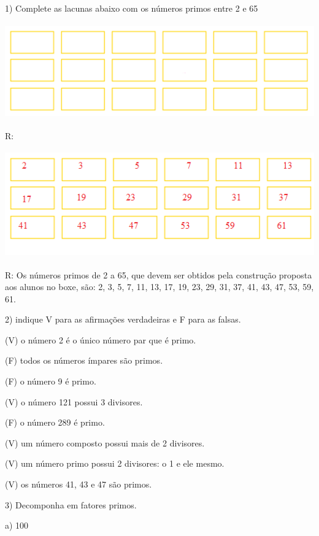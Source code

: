 
1) Complete as lacunas abaixo com os números primos entre 2 e 65


\includegraphics[width=5.54167in,height=1.625in]{./imgSAEB_6_MAT/media/image9.png}

R:

\includegraphics[width=5.47708in,height=1.81389in]{./imgSAEB_6_MAT/media/image10.png}

R: Os números primos de 2 a 65, que devem ser obtidos pela construção
proposta aos alunos no boxe, são: 2, 3, 5, 7, 11, 13, 17, 19, 23, 29,
31, 37, 41, 43, 47, 53, 59, 61.

2) indique V para as afirmações verdadeiras e F para as falsas.

(V) o número 2 é o único número par que é primo.

(F) todos os números ímpares são primos.

(F) o número 9 é primo.

(V) o número 121 possui 3 divisores.

(F) o número 289 é primo.

(V) um número composto possui mais de 2 divisores.

(V) um número primo possui 2 divisores: o 1 e ele mesmo.

(V) os números 41, 43 e 47 são primos.

3) Decomponha em fatores primos.

a) 100

